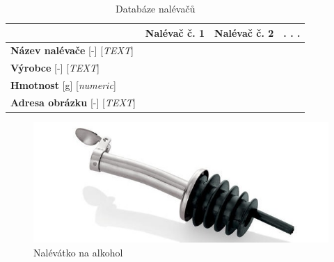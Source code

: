 \begin{table} [!h]
    \centering
    \begin{tabular}{|l|l|l|l|}
    \hline
         & Nalévač č. 1 & Nalévač č. 2 &  . . .\\ \hline
         \textbf{Název nalévače} [-] [\textit{TEXT}] & & &\\ \hline
         \textbf{Výrobce} [-] [\textit{TEXT}] & & &\\ \hline
         \textbf{Hmotnost} [g] [\textit{numeric}] & & &\\ \hline
         \textbf{Adresa obrázku} [-] [\textit{TEXT}] & & &\\ \hline
    \end{tabular}
    \caption{Databáze nalévačů}
    \label{tab:my_label}
\end{table}
\begin{figure}[!h]
    \begin{center}
        \includegraphics[scale=0.6]{obrazky/nalevac.jpg}
    \end{center}
    \label{nalevačos}
    \caption{Nalévátko na alkohol \cite{nalevatko}}
\end{figure}
